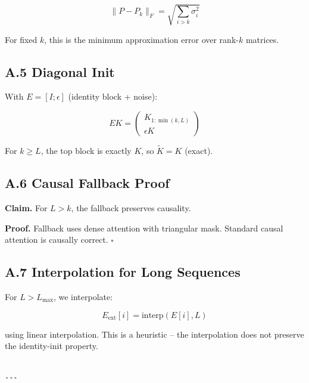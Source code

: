 \[
\|P - P_k\|_F = \sqrt{\sum_{i > k} \sigma_i^2}
\tag{A.5}
\]

For fixed $k$, this is the minimum approximation error over rank-$k$ matrices.

\subsection{A.5 Diagonal Init}

With $E = [I; \epsilon]$ (identity block + noise):

\[
E K = \begin{pmatrix} K_{1:\min(k,L)} \\ \epsilon K \end{pmatrix}
\tag{A.6}
\]

For $k \geq L$, the top block is exactly $K$, so $\tilde{K} = K$ (exact).

\subsection{A.6 Causal Fallback Proof}

\textbf{Claim.} For $L > k$, the fallback preserves causality.

\textbf{Proof.} Fallback uses dense attention with triangular mask. Standard 
causal attention is causally correct. $\square$

\subsection{A.7 Interpolation for Long Sequences}

For $L > L_\text{max}$, we interpolate:

\[
E_\text{ext}[i] = \text{interp}(E[i], L)
\tag{A.7}
\]

using linear interpolation. This is a heuristic -- the interpolation does 
not preserve the identity-init property.
\begin{lstlisting}

---
\end{lstlisting}